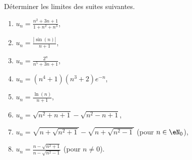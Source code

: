 
\begin{exercice}\label{exoTD3-0003}

	Déterminer les limites des suites suivantes.

	\begin{enumerate}
		\item
			$u_n=\frac{ n^2+3n+1 }{ 1+n^2+n^3 }$,
		\item
			$u_n=\frac{ | \sin(n) | }{ n+1 }$,
		\item
			$u_n=\frac{ 2^n }{ n^5+3n+1 }$,
		\item
			$u_n=(n^4+1)(n^3+2) e^{-n}$,
		\item
			$u_n=\frac{ \ln(n) }{ n+1 }$,
		\item
			$u_n=\sqrt{n^2+n+1}-\sqrt{n^2-n+1}$,
		\item
			$u_n=\sqrt{n+\sqrt{n^2+1}}-\sqrt{n+\sqrt{n^2-1}}$ (pour $n\in\eN_0$),
		\item
			$u_n=\frac{ n-\sqrt{n^2+1} }{ n-\sqrt{n^2-1} }$ (pour $n\neq 0$).
	\end{enumerate}
	

\end{exercice}
